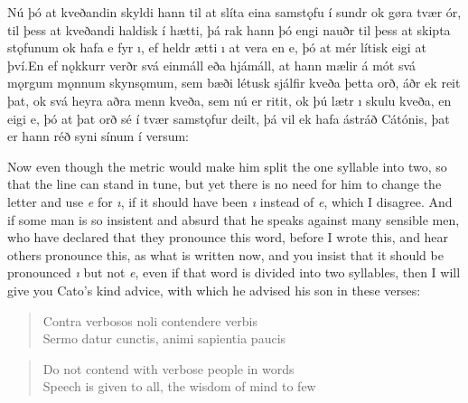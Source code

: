 \begin{paracol}{2}
  Nú þó at kveðandin skyldi hann til at slíta eina samstǫfu í sundr ok gøra tvær ór, til þess at kveðandi haldisk í hætti, þá rak hann þó engi nauðr til þess at skipta stǫfunum ok hafa e fyr ı, ef heldr ætti ı at vera en e, þó at mér lítisk eigi at því.\footnotemark En ef nǫkkurr verðr svá einmáll eða hjámáll, at hann mælir á mót svá mǫrgum mǫnnum skynsǫmum, sem bæði létusk sjálfir kveða þetta orð, áðr ek reit þat, ok svá heyra aðra menn kveða, sem nú er ritit, ok þú lætr ı skulu kveða, en eigi e, þó at þat orð sé í tvær samstǫfur deilt, þá vil ek hafa ástráð Cátónis, þat er hann réð syni sínum í versum:

  \switchcolumn
  Now even though the metric would make him split the one syllable into two, so that the line can stand in tune, but yet there is no need for him to change the letter and use \textit{e} for \textit{ı}, if it should have been \textit{ı} instead of \textit{e}, which I disagree. And if some man is so insistent and absurd that he speaks against many sensible men, who have declared that they pronounce this word, before I wrote this, and hear others pronounce this, as what is written now, and you insist that it should be pronounced \textit{ı} but not \textit{e}, even if that word is divided into two syllables, then I will give you Cato's kind advice, with which he advised his son in these verses:

  \switchcolumn*

  \begin{quote}
    Contra verbosos noli contendere verbis\\
    Sermo datur cunctis, animi sapientia paucis
  \end{quote}

  \switchcolumn

  \begin{quote}
    Do not contend with verbose people in words\\ Speech is given to all, the wisdom of mind to few
  \end{quote}

\end{paracol}

